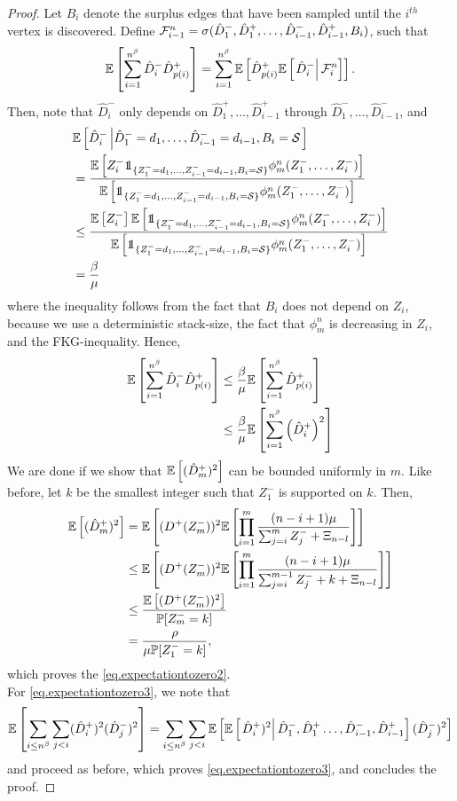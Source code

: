 \begin{proof}
Let $B_i$ denote the surplus edges that have been sampled until the $i^{th}$ vertex is discovered. Define ${\mathcal F}^n_{i-1}=\sigma(\hat{D}^-_1,\hat{D}^+_1,\dots,\hat{D}^-_{i-1},\hat{D}^+_{i-1}, B_i)$, such that
$${\mathbb E}\left[\sum_{i=1}^{n^\beta} \hat{D}^-_i\hat{D}^+_{p(i)}\right]=\sum_{i=1}^{n^\beta}{\mathbb E}\left[\hat{D}^+_{p(i)}{\mathbb E}\left[\left.\hat{D}^-_i\right|{\mathcal F}^n_i\right]\right].$$
Then, note that $\hat{D}^-_i$ only depends on $\hat{D}^+_1,\dots,\hat{D}^+_{i-1}$ through $\hat{D}^-_1,\dots,\hat{D}^-_{i-1}$, and
\begin{align*}
  &\E\left[\hat{D}^-_i\left|\hat{D}^-_1=d_1,\dots,\hat{D}^-_{i-1}=d_{i-1}, B_i=\mathcal{S}\right.\right]\\
  &=\frac{\E\left[Z_i^-\one_{\{Z^-_1=d_1,\dots,Z^-_{i-1}=d_{i-1}, B_i=\mathcal{S} \}} \phi^n_m(Z_1^-,\dots,Z_i^-)\right]}{\E\left[\one_{\{Z^-_1=d_1,\dots,Z^-_{i-1}=d_{i-1}, B_i=\mathcal{S} \} }\phi^n_m(Z_1^-,\dots,Z_i^-)\right]}\\
  &\leq\frac{\E\left[Z_i^-\right]\E\left[\one_{\{Z^-_1=d_1,\dots,Z^-_{i-1}=d_{i-1}, B_i=\mathcal{S} \}} \phi^n_m(Z_1^-,\dots,Z_i^-)\right]}{\E\left[\one_{\{Z^-_1=d_1,\dots,Z^-_{i-1}=d_{i-1}, B_i=\mathcal{S} \}} \phi^n_m(Z_1^-,\dots,Z_i^-)\right]}\\
 &=\frac{\beta}{\mu}
\end{align*}
where the inequality follows from the fact that $B_i$ does not depend on $Z_i$, because we use a deterministic stack-size, the fact that $\phi^n_m$ is decreasing in $Z_i$, and the FKG-inequality.
Hence, 
\begin{align*}{\mathbb E}\left[\sum_{i=1}^{n^\beta} \hat{D}^-_i\hat{D}^+_{p(i)}\right]&\leq \frac{\beta}{\mu} {\mathbb E}\left[ \sum_{i=1}^{n^\beta}\hat{D}^+_{p(i)}\right]\\
&\leq \frac{\beta}{\mu} {\mathbb E}\left[ \sum_{i=1}^{n^\beta}\left(\hat{D}^+_{i}\right)^2\right]\end{align*}
We are done if we show that ${\mathbb E}\left[(\hat{D}^+_m)^2 \right]$ can be bounded uniformly in $m$. 
Like before, let $k$ be the smallest integer such that $Z^-_1$ is supported on $k$. Then,
\begin{align*}
    {\mathbb E}\left[(\hat{D}^+_m)^2 \right]&={\mathbb E}\left[(D^+(Z^-_m))^2{\mathbb E}\left[\prod\limits_{i=1}^m \frac{(n-i+1)\mu}{\sum_{j=i}^m Z^-_j + \Xi_{n-l}}\right]\right]\\
    &\leq {\mathbb E}\left[(D^+(Z^-_m))^2{\mathbb E}\left[\prod\limits_{i=1}^m \frac{(n-i+1)\mu}{\sum_{j=i}^{m-1} Z^-_j + k+ \Xi_{n-l}}\right]\right ]\\
    &\leq \frac{{\mathbb E}\left[(D^+(Z^-_m))^2\right]}{{\mathbb P}[Z^-_m=k]}\\
    &= \frac{\rho}{\mu {\mathbb P}[Z^-_1=k]}, 
\end{align*}
which proves the \eqref{eq.expectationtozero2}.\\
For \eqref{eq.expectationtozero3}, we note that 
$${\mathbb E}\left[\sum_{i\leq n^{\beta}}\sum_{j<i}(\hat{D}^+_i)^2(\hat{D}^-_j)^2\right]=\sum_{i\leq n^{\beta}}\sum_{j<i}{\mathbb E}\left[{\mathbb E}\left[\left.\hat{D}^+_i)^2\right|\hat{D}^-_1,\hat{D}^+_1\dots, \hat{D}^-_{i-1},\hat{D}^+_{i-1}\right](\hat{D}^-_j)^2\right]$$
and proceed as before, which proves \eqref{eq.expectationtozero3}, and concludes the proof.
\end{proof}

